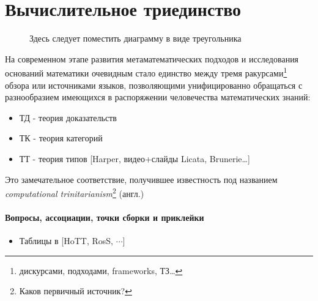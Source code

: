 \section{Вычислительное триединство}

\begin{figure}[ht] 
  \center
  \caption{Здесь следует поместить диаграмму в виде треугольника}
  \label{img:trinitary}  
\end{figure}

На современном этапе развития метаматематических подходов и исследования оснований математики 
очевидным стало единство между тремя ракурсами\footnote{дискурсами, подходами, frameworks, 
ТЗ\ldots} обзора или источниками языков, позволяющими унифицированно обращаться 
с разнообразием имеющихся в распоряжении человечества математических знаний:

\begin{itemize}
\item{ТД} - теория доказательств

\item{ТК} - теория категорий

\item{ТТ} - теория типов [Harper, видео+слайды Licata, Brunerie\ldots]
\end{itemize}

Это замечательное соответствие, получившее известность под названием \emph{computational 
trinitarianism}\footnote{Каков первичный источник?} (англ.)

\paragraph*{Вопросы, ассоциации, точки сборки и приклейки}
\begin{itemize}
\item Таблицы в [HoTT, RosS, $\cdots$]
\end{itemize}
